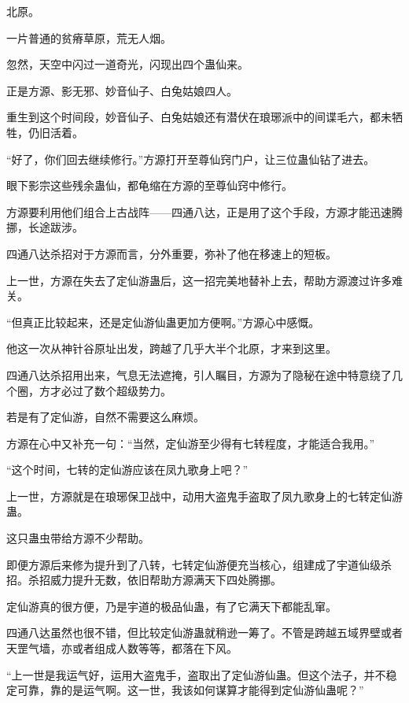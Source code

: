 
\begin{this_body}



北原。

一片普通的贫瘠草原，荒无人烟。

忽然，天空中闪过一道奇光，闪现出四个蛊仙来。

正是方源、影无邪、妙音仙子、白兔姑娘四人。

重生到这个时间段，妙音仙子、白兔姑娘还有潜伏在琅琊派中的间谍毛六，都未牺牲，仍旧活着。

“好了，你们回去继续修行。”方源打开至尊仙窍门户，让三位蛊仙钻了进去。

眼下影宗这些残余蛊仙，都龟缩在方源的至尊仙窍中修行。

方源要利用他们组合上古战阵——四通八达，正是用了这个手段，方源才能迅速腾挪，长途跋涉。

四通八达杀招对于方源而言，分外重要，弥补了他在移速上的短板。

上一世，方源在失去了定仙游蛊后，这一招完美地替补上去，帮助方源渡过许多难关。

“但真正比较起来，还是定仙游仙蛊更加方便啊。”方源心中感慨。

他这一次从神针谷原址出发，跨越了几乎大半个北原，才来到这里。

四通八达杀招用出来，气息无法遮掩，引人瞩目，方源为了隐秘在途中特意绕了几个圈，方才必过了数个超级势力。

若是有了定仙游，自然不需要这么麻烦。

方源在心中又补充一句：“当然，定仙游至少得有七转程度，才能适合我用。”

“这个时间，七转的定仙游应该在凤九歌身上吧？”

上一世，方源就是在琅琊保卫战中，动用大盗鬼手盗取了凤九歌身上的七转定仙游蛊。

这只蛊虫带给方源不少帮助。

即便方源后来修为提升到了八转，七转定仙游便充当核心，组建成了宇道仙级杀招。杀招威力提升无数，依旧帮助方源满天下四处腾挪。

定仙游真的很方便，乃是宇道的极品仙蛊，有了它满天下都能乱窜。

四通八达虽然也很不错，但比较定仙游蛊就稍逊一筹了。不管是跨越五域界壁或者天罡气墙，亦或者组成人数等等，都落在下风。

“上一世是我运气好，运用大盗鬼手，盗取出了定仙游仙蛊。但这个法子，并不稳定可靠，靠的是运气啊。这一世，我该如何谋算才能得到定仙游仙蛊呢？”


\end{this_body}
